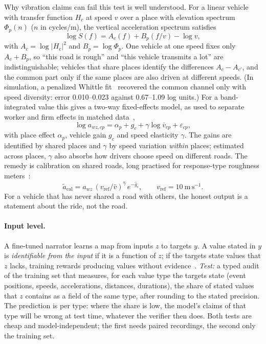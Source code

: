 Why vibration claims can fail this test is well understood.
For a linear vehicle with transfer function $H_c$ at speed $v$ over a place with elevation spectrum $\Phi_p(n)$ ($n$ in cycles/m), the vertical acceleration spectrum satisfies~\cite{dodds1973roughness,gonzalez2008roughness}
\begin{equation}
\log S(f)=A_c(f)+B_p(f/v)-\log v,
\label{eq:scr}
\end{equation}
with $A_c=\log|H_c|^2$ and $B_p=\log\Phi_p$.
One vehicle at one speed fixes only $A_c+B_p$, so ``this road is rough'' and ``this vehicle transmits a lot'' are indistinguishable; vehicles that share places identify the differences $A_c-A_{c'}$, and the common part only if the same places are also driven at different speeds.
(In simulation, a penalized Whittle fit~\cite{pawitan1994whittle} recovered the common channel only with speed diversity: error 0.010--0.023 against 0.67--1.09 log units.)
For a band-integrated value this gives a two-way fixed-effects model, as used to separate worker and firm effects in matched data~\cite{abowd1999akm},
\begin{equation}
\log a_{wz,cp}=\alpha_p+g_c+\gamma\log\bar v_{cp}+\varepsilon_{cp},
\label{eq:fe}
\end{equation}
with place effect $\alpha_p$, vehicle gain $g_c$ and speed elasticity $\gamma$.
The gains are identified by shared places and $\gamma$ by speed variation \emph{within} places; estimated across places, $\gamma$ also absorbs how drivers choose speed on different roads.
The remedy is calibration on shared roads, long practised for response-type roughness meters~\cite{sayers1986iri}:
\begin{equation}
\tilde a_{\mathrm{cal}}=a_{wz}\,(v_{\mathrm{ref}}/\bar v)^{\hat\gamma}\,e^{-\hat g_c},\qquad v_{\mathrm{ref}}=10~\mathrm{m\,s^{-1}}.
\label{eq:cal}
\end{equation}
For a vehicle that has never shared a road with others, the honest output is a statement about the ride, not the road.

\paragraph{Input level.}
A fine-tuned narrator learns a map from inputs $z$ to targets $y$. A value stated in $y$ is \emph{identifiable from the input} if it is a function of $z$; if the targets state values that $z$ lacks, training rewards producing values without evidence~\cite{dhingra2019parent,gekhman2024newknowledge}.
\emph{Test:} a typed audit of the training set that measures, for each value type the targets state (event positions, speeds, accelerations, distances, durations), the share of stated values that $z$ contains as a field of the same type, after rounding to the stated precision.
The prediction is per type: where the share is low, the model's claims of that type will be wrong at test time, whatever the verifier then does.
Both tests are cheap and model-independent; the first needs paired recordings, the second only the training set.
